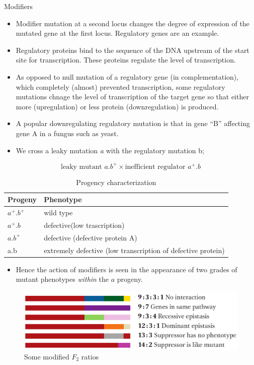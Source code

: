 \documentclass[11pt,dvipsnames,ignorenonframetext,aspectratio=169]{beamer}
\providecommand{\tightlist}{%
  \setlength{\itemsep}{0pt}\setlength{\parskip}{0pt}}
\begin{document}
\begin{frame}{Modifiers}
\protect\hypertarget{modifiers}{}
\begin{itemize}
\tightlist
\item
  Modifier mutation at a second locus changes the degree of expression
  of the mutated gene at the first locus. Regulatory genes are an
  example.
\item
  Regulatory proteins bind to the sequence of the DNA upstream of the
  start site for transcription. These proteins regulate the level of
  transcription.
\item
  As opposed to null mutation of a regulatory gene (in complementation),
  which completely (almost) prevented transcription, some regulatory
  mutations chnage the level of transcription of the target gene so that
  either more (upregulation) or less protein (downregulation) is
  produced.
\item
  A popular downregulating regulatory mutation is that in gene ``B''
  affecting gene A in a fungus such as yeast.
\item
  We cross a leaky mutation \emph{a} with the regulatory mutation b;
\end{itemize}

\[
\textrm{leaky mutant } a.b^+ \times \textrm{inefficient regulator } a^+.b
\]
\end{frame}

\begin{frame}{}
\protect\hypertarget{section-25}{}
\begin{table}

\caption{\label{tab:gene-modifieres}Progency characterization}
\centering
\fontsize{8}{10}\selectfont
\begin{tabular}[t]{ll}
\toprule
Progeny & Phenotype\\
\midrule
$a^+. b^+$ & wild type\\
$a^+.b$ & defective(low trascription)\\
$a.b^+$ & defective (defective protein A)\\
a.b & extremely defective (low transcription of defective protein)\\
\bottomrule
\end{tabular}
\end{table}

\begin{itemize}
\tightlist
\item
  Hence the action of modifiers is seen in the appearance of two grades
  of mutant phenotypes \emph{within} the \(a\) progeny.
\end{itemize}

\begin{figure}

{\centering \includegraphics[width=0.35\linewidth]{./../images/gene_modification_ratios} 

}

\caption{Some modified $F_2$ ratios}\label{fig:gene-modification-ratios}
\end{figure}
\end{frame}
\end{document}
